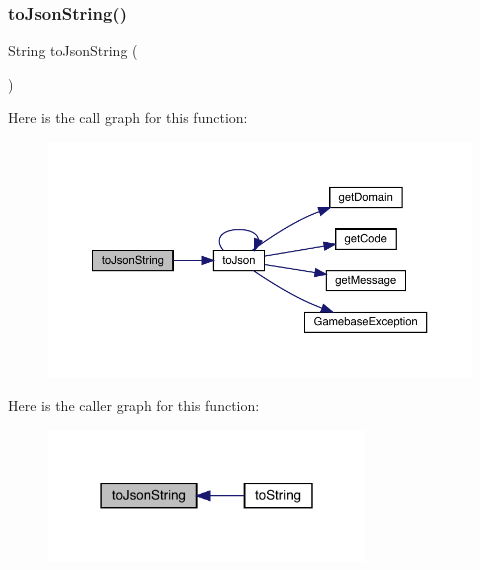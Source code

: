 \subsubsection{\texorpdfstring{to\+Json\+String()}{toJsonString()}}
{\footnotesize\ttfamily String to\+Json\+String (\begin{DoxyParamCaption}{ }\end{DoxyParamCaption})}

Here is the call graph for this function\+:
\nopagebreak
\begin{figure}[H]
\begin{center}
\leavevmode
\includegraphics[width=350pt]{classcom_1_1toast_1_1android_1_1gamebase_1_1base_1_1_gamebase_exception_a58acf6402880e9769d79d8667581fa6a_cgraph}
\end{center}
\end{figure}
Here is the caller graph for this function\+:\nopagebreak
\begin{figure}[H]
\begin{center}
\leavevmode
\includegraphics[width=238pt]{classcom_1_1toast_1_1android_1_1gamebase_1_1base_1_1_gamebase_exception_a58acf6402880e9769d79d8667581fa6a_icgraph}
\end{center}
\end{figure}
\mbox{\label{classcom_1_1toast_1_1android_1_1gamebase_1_1base_1_1_gamebase_exception_a054431f3d988a22295cfc8b784ff2637}} 
